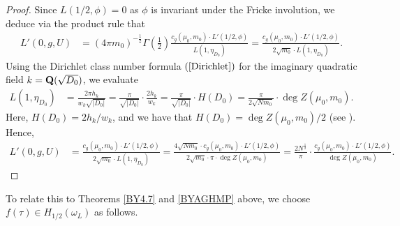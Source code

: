\documentclass{amsart}
\theoremstyle{definition}
\theoremstyle{definition}
\theoremstyle{definition}
\begin{document}
\begin{proof}
Since $L(1/2, \phi)=0$ as $\phi$ is invariant under the Fricke involution, we deduce via the product rule that 
\begin{align}\label{L'(0)} L'(0, g, U) &= (4 \pi m_0)^{-  \frac{1}{2} } \Gamma \left( \frac{1}{2} \right) 
\frac{ c_g(\mu_0, m_0) \cdot L'(1/2, \phi) }{ L(1, \eta_{D_0}) } = \frac{ c_g(\mu_0, m_0) 
\cdot L'(1/2, \phi)}{2 \sqrt{m_0} \cdot L(1, \eta_{D_0})}. \end{align} 
Using the Dirichlet class number formula $(\ref{Dirichlet})$ for the imaginary quadratic field $k={\bf{Q}}(\sqrt{D_0}) $, we evaluate 
\begin{align*} L(1, \eta_{D_0} ) &=  \frac{ 2 \pi h_k  }{ w_k \sqrt{ \vert D_0 \vert }  } 
= \frac{ \pi}{\sqrt{\vert D_0 \vert}} \cdot \frac{2 h_k}{ w_k} = \frac{ \pi}{ \sqrt{\vert D_0 \vert}} \cdot H(D_0)
= \frac{  \pi }{ 2 \sqrt{N m_0} } \cdot \deg Z(\mu_0, m_0). \end{align*} 
Here, $H(D_0) = 2 h_k/w_k$, and we have that $H(D_0) = \deg Z(\mu_0, m_0)/2$ (see \cite[Lemma 6.3]{BY}). Hence,
\begin{align}\label{HurwitzID} L'(0, g, U) &= \frac{ c_g(\mu_0, m_0) \cdot L'(1/2, \phi)}{2 \sqrt{m_0} \cdot L(1, \eta_{D_0})}
= \frac{ 4 \sqrt{N m_0} \cdot c_g(\mu_0, m_0) \cdot L'(1/2, \phi)}{ 2 \sqrt{m_0} \cdot \pi  \cdot \deg Z(\mu_0, m_0) }
= \frac{ 2 N^ {\frac{1}{2}} }{ \pi} \cdot \frac{ c_g(\mu_0, m_0) \cdot L'(1/2, \phi)}{ \deg Z(\mu_0, m_0) } . \end{align}\end{proof}

To relate this to Theorems \ref{BY4.7} and \ref{BYAGHMP} above, we choose $f(\tau) \in H_{1/2}(\omega_L)$ as follows. 
\end{document}
